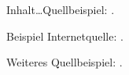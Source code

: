 
Inhalt\ldots Quellbeispiel: \cite[S.~2]{Plenk2019}.

Beispiel Internetquelle: \cite{Siemens2023}.

Weiteres Quellbeispiel: \cite[S.~30ff.]{Siemens}.
